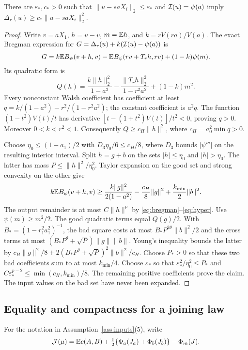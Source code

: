\begin{lemma}\label{lem:local}
There are $\varepsilon_*,c_*>0$ such that
$\|u-saX_i\|_2\le\varepsilon_*$ and $\mathcal I(u)=\psi(a)$ imply
$\Delta_r(u)\ge c_*\|u-saX_i\|_2^2$.
\end{lemma}
\begin{proof}
Write $v=aX_1$, $h=u-v$, $m=\mathbb E h$, and $k=rV(ra)/V(a)$.
The exact Bregman expression for
$G=\Delta_r(u)+k(\mathcal I(u)-\psi(a))$ is
\[
 G=k\mathbb E B_\psi(v+h,v)-\mathbb E B_\psi(rv+T_rh,rv)+(1-k)\psi(m).
\]
Its quadratic form is
\[
 Q(h)=\frac{k\|h\|_2^2}{1-a^2}
 -\frac{\|T_rh\|_2^2}{1-r^2a^2}+(1-k)m^2.
\]
Every nonconstant Walsh coefficient has coefficient at least
$q=k/(1-a^2)-r^2/(1-r^2a^2)$; the constant coefficient is $a^2q$.
The function $(1-t^2)V(t)/t$ has derivative
$[t-(1+t^2)V(t)]/t^2<0$, proving $q>0$. Moreover $0<k<r^2<1$.
Consequently $Q\ge c_H\|h\|^2$, where $c_H=a_0^2\min q>0$.

Choose $\eta_0\le(1-a_1)/2$ with $D_3\eta_0/6\le c_H/8$,
where $D_3$ bounds $|\psi'''|$ on the resulting interior interval.
Split $h=g+b$ on the sets $|h|\le\eta_0$ and $|h|>\eta_0$.
The latter has mass $P\le\|h\|^2/\eta_0^2$.
Taylor expansion on the good set and strong convexity on the other give
\[
 k\mathbb E B_\psi(v+h,v)\ge
 \frac{k\|g\|^2}{2(1-a^2)}-\frac{c_H}8\|g\|^2
 +\frac{k_{\min}}2\|b\|^2.
\]
The output remainder is at most $C\|h\|^p$ by
\eqref{eq:bregman}--\eqref{eq:hyper}. Use $\psi(m)\ge m^2/2$.
The good quadratic terms equal $Q(g)/2$. With
$B_*=(1-r_1^2a_1^2)^{-1}$, the bad square costs at most
$B_*P^{2\theta}\|b\|^2/2$ and the cross terms at most
$(B_*P^\theta+\sqrt P)\|g\|\|b\|$.
Young's inequality bounds the latter by
$c_H\|g\|^2/8+2(B_*P^\theta+\sqrt P)^2\|b\|^2/c_H$.
Choose $P_*>0$ so that these two bad coefficients sum to at most
$k_{\min}/4$. Choose $\varepsilon_*$ so that
$\varepsilon_*^2/\eta_0^2\le P_*$ and
$C\varepsilon_*^{p-2}\le\min(c_H,k_{\min})/8$.
The remaining positive coefficients prove the claim. The input values
on the bad set have never been expanded.
\end{proof}

\subsection{Equality and compactness for a joining law}
For the notation in Assumption~\ref{ass:inputs}(5), write
\[
 \mathcal J(\mu)=\mathbb E c(A,B)
 +\tfrac12\{\Phi_a(J_a)+\Phi_b(J_b)\}-\Phi_m(J).
\]

